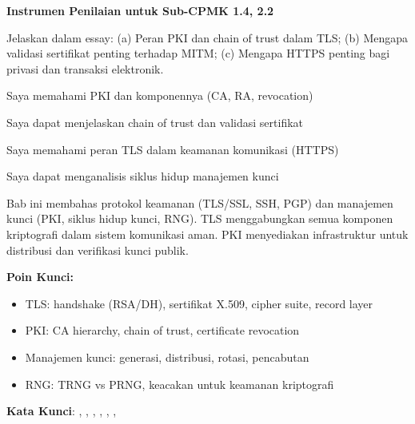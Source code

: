 \documentclass[main.tex]{subfiles}
\begin{document}

\begin{asesmen}
\textbf{Instrumen Penilaian untuk Sub-CPMK 1.4, 2.2}

Jelaskan dalam essay: (a) Peran PKI dan chain of trust dalam TLS; (b) Mengapa validasi sertifikat penting terhadap MITM; (c) Mengapa HTTPS penting bagi privasi dan transaksi elektronik.
\end{asesmen}


\begin{checklist}
  \item Saya memahami PKI dan komponennya (CA, RA, revocation)
  \item Saya dapat menjelaskan chain of trust dan validasi sertifikat
  \item Saya memahami peran TLS dalam keamanan komunikasi (HTTPS)
  \item Saya dapat menganalisis siklus hidup manajemen kunci
\end{checklist}


\begin{rangkuman}
Bab ini membahas protokol keamanan (TLS/SSL, SSH, PGP) dan manajemen kunci (PKI, siklus hidup kunci, RNG). TLS menggabungkan semua komponen kriptografi dalam sistem komunikasi aman. PKI menyediakan infrastruktur untuk distribusi dan verifikasi kunci publik.

\textbf{Poin Kunci:}
\begin{itemize}
  \item TLS: handshake (RSA/DH), sertifikat X.509, cipher suite, record layer
  \item PKI: CA hierarchy, chain of trust, certificate revocation
  \item Manajemen kunci: generasi, distribusi, rotasi, pencabutan
  \item RNG: TRNG vs PRNG, keacakan untuk keamanan kriptografi
\end{itemize}

\textbf{Kata Kunci}: , , , , , , 
\end{rangkuman}
\end{document}
